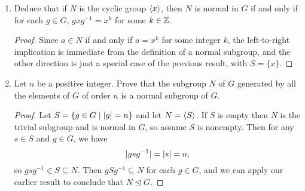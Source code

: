 \begin{enumerate}
\begin{proof}
    Now suppose $gSg^{-1}\subseteq N$ for all $g\in G$, and pick any
    $x\in N$. Since $N = \gen{S}$, we may write
    \begin{equation*}
      x = s_1s_2\cdots s_k,
      \quad\text{where $s_i\in S$ for each $i = 1,2,\dots,k$}.
    \end{equation*}
    Since we have already proven above that the conjugate of a product
    is the product of the conjugates, we have for all $g\in G$ that
    \begin{equation*}
      gxg^{-1} = (gs_1g^{-1})(gs_2g^{-1})\cdots(gs_kg^{-1})\in N.
    \end{equation*}
    Therefore $gNg^{-1}\subseteq N$ for all $g\in G$ and we can
    conclude that $N\trianglelefteq G$.
  \end{proof}
\item Deduce that if $N$ is the cyclic group $\langle{x}\rangle$, then $N$ is
  normal in $G$ if and only if for each $g\in G$, $gxg^{-1} = x^k$ for
  some $k\in\mathbb{Z}$.
  \begin{proof}
    Since $a\in N$ if and only if $a = x^k$ for some integer $k$, the
    left-to-right implication is immediate from the definition of a
    normal subgroup, and the other direction is just a special case of
    the previous result, with $S = \{x\}$.
  \end{proof}
\item Let $n$ be a positive integer. Prove that the subgroup $N$ of
  $G$ generated by all the elements of $G$ of order $n$ is a normal
  subgroup of $G$.
  \begin{proof}
    Let $S = \{g\in G\mid\lvert{g}\rvert = n\}$ and let $N = \gen{S}$. If $S$
    is empty then $N$ is the trivial subgroup and is normal in $G$, so
    assume $S$ is nonempty. Then for any $s\in S$ and $g\in G$, we
    have
    \begin{equation*}
      \lvert{gsg^{-1}}\rvert = \lvert{s}\rvert = n,
    \end{equation*}
    so $gsg^{-1}\in S\subseteq{N}$. Then $gSg^{-1}\subseteq N$ for
    each $g\in G$, and we can apply our earlier result to conclude
    that $N\trianglelefteq G$.
  \end{proof}
\end{enumerate}

